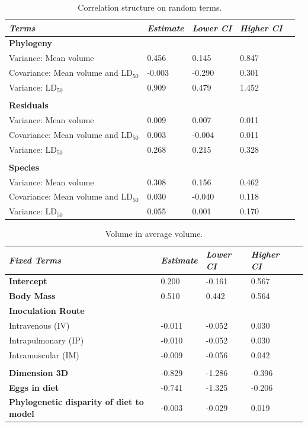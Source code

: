 \begin{table}[h!]
  \centering
    \caption[Table 1.]{Correlation structure on random terms.}
\begin{tabular}{*5l}    \toprule
\emph{Terms} & \emph{Estimate} & \emph{Lower CI} & \emph{Higher CI}\\\midrule
\textbf{Phylogeny} &   &   &  \\ 
Variance: Mean volume & 0.456 & 0.145 & 0.847 \\
Covariance: Mean volume and LD$_{50}$ & -0.003  & -0.290  & 0.301 \\
Variance: LD$_{50}$ & 0.909 & 0.479 & 1.452 \\

 &   &   &  \\

\textbf{Residuals} &   &   &  \\ 
Variance: Mean volume & 0.009 & 0.007 & 0.011 \\
Covariance: Mean volume and LD$_{50}$ & 0.003  & -0.004  & 0.011 \\
Variance: LD$_{50}$ & 0.268 & 0.215 & 0.328 \\

 &   &   &  \\ 

\textbf{Species} &   &   &  \\ 
Variance: Mean volume & 0.308 & 0.156 & 0.462 \\
Covariance: Mean volume and LD$_{50}$ & 0.030  & -0.040  & 0.118 \\
Variance: LD$_{50}$ & 0.055 & 0.001 & 0.170 \\\bottomrule
 \hline
\end{tabular}
  \label{tbl:Table 1.}
\end{table}




\begin{table}[h!]
  \centering
    \caption[Table 2.]{Volume in average volume.}
\begin{tabular}{*5l}    \toprule
\emph{Fixed Terms} & \emph{Estimate} & \emph{Lower CI} & \emph{Higher CI}\\\midrule
\textbf{Intercept} & 0.200  & -0.161 & 0.567 \\ 
\textbf{Body Mass} & 0.510  & 0.442 & 0.564 \\ 
\textbf{Inoculation Route} &  &  &  \\ 
 Intravenous (IV) & -0.011 & -0.052 & 0.030 \\
 Intrapulmonary (IP) & -0.010 & -0.052 & 0.030 \\ 
 Intramuscular (IM) & -0.009 & -0.056 & 0.042 \\
  &  &  &  \\ 
\textbf{Dimension 3D} & -0.829 & -1.286 & -0.396 \\ 
\textbf{Eggs in diet} & -0.741 & -1.325 & -0.206 \\ 
\textbf{Phylogenetic disparity of diet to model} & -0.003 & -0.029 & 0.019 \\\bottomrule
 \hline
\end{tabular}
  \label{tbl:Table 2.}
\end{table}



